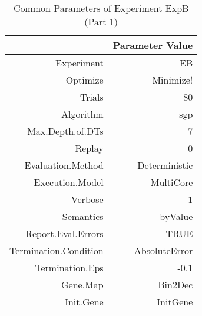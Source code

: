 \begin{table}[ht]
\centering
\begin{tabular}{rr}
  \hline
 & Parameter Value \\ 
  \hline
Experiment & EB \\ 
  Optimize & Minimize! \\ 
  Trials & 80 \\ 
  Algorithm & sgp \\ 
  Max.Depth.of.DTs & 7 \\ 
  Replay & 0 \\ 
  Evaluation.Method & Deterministic \\ 
  Execution.Model & MultiCore \\ 
  Verbose & 1 \\ 
  Semantics & byValue \\ 
  Report.Eval.Errors & TRUE \\ 
  Termination.Condition & AbsoluteError \\ 
  Termination.Eps & -0.1 \\ 
  Gene.Map & Bin2Dec \\ 
  Init.Gene & InitGene \\ 
   \hline
\end{tabular}
\caption{Common Parameters of Experiment ExpB (Part 1)} 
\end{table}
